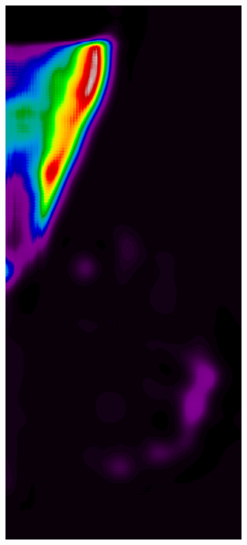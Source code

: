 \documentclass{beamer}
\begin{document}
\begin{frame}
\begin{figure}
\begin{subfigure}{0.134\textwidth}
            \end{subfigure}
            \begin{subfigure}{0.134\textwidth}
	            \centering
		            \includegraphics[width=\textwidth]{plots/examples/example4_probs_3.png}
            \end{subfigure}
        \end{figure}
    \end{frame}
\end{document}
